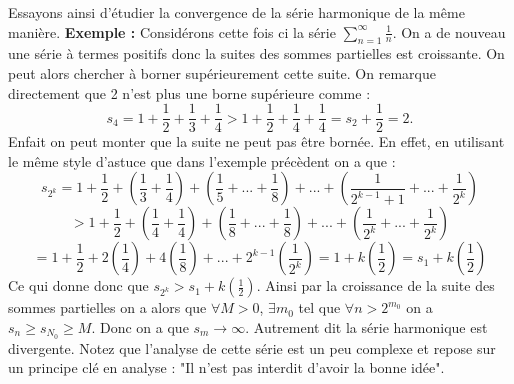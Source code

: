 \documentclass[a4paper, 12pt, french, twoside]{article}
\begin{document}
Essayons ainsi d'étudier la convergence de la série harmonique de la même manière. 
 \newline
\textbf{Exemple :} Considérons cette fois ci la série $\sum_{n=1}^{\infty} \frac{1}{n}$. On a de nouveau une série à termes positifs donc la suites des sommes partielles est croissante. On peut alors chercher à borner supérieurement cette suite. On remarque directement que 2 n'est plus une borne supérieure comme :
$$ s_4 = 1 + \frac{1}{2} + \frac{1}{3} + \frac{1}{4} > 1 + \frac{1}{2} + \frac{1}{4} + \frac{1}{4} = s_2 + \frac{1}{2} = 2. $$ 
Enfait on peut monter que la suite ne peut pas être bornée. En effet, en utilisant le même style d'astuce que dans l'exemple précèdent on a que :
$$ s_{2^k} = 1 + \frac{1}{2} + \left (\frac{1}{3}+ \frac{1}{4} \right ) + \left( \frac{1}{5} + ... + \frac{1}{8} \right ) + ... + \left( \frac{1}{2^{k-1}+1} + ... + \frac{1}{2^k} \right ) $$
$$ >  1 + \frac{1}{2} + \left (\frac{1}{4}+ \frac{1}{4} \right ) + \left( \frac{1}{8} + ... + \frac{1}{8} \right ) + ... + \left( \frac{1}{2^{k}} + ... + \frac{1}{2^k} \right ) $$
$$ =  1 + \frac{1}{2} + 2\left (\frac{1}{4} \right ) + 4\left( \frac{1}{8} \right ) + ... + 2^{k-1} \left( \frac{1}{2^{k}} \right ) = 1 + k \left (\frac{1}{2} \right ) = s_1 + k \left (\frac{1}{2} \right )$$
Ce qui donne donc que $s_{2^k} >  s_1 + k \left (\frac{1}{2} \right ) $. Ainsi par la croissance de la suite des sommes partielles on a alors que $\forall M > 0$, $\exists m_0$ tel que $\forall n > 2^{m_0}$ on a $s_n \ge s_{N_0} \ge M$. Donc on a que $s_m \rightarrow \infty$. Autrement dit la série harmonique est divergente. Notez que l'analyse de cette série est un peu complexe et repose sur un principe clé en analyse : "Il n'est pas interdit d'avoir la bonne idée".\\
\end{document}
